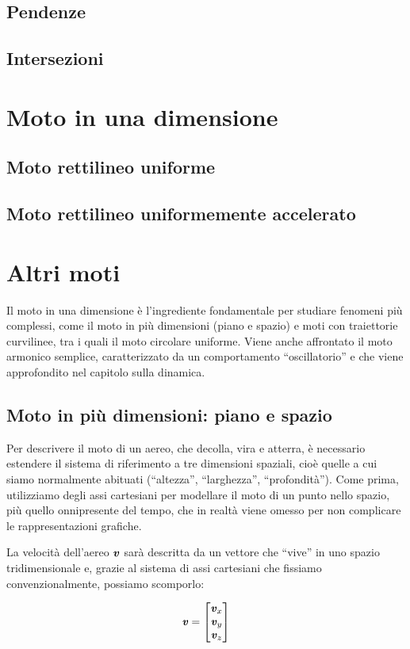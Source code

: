\subsection{Pendenze}
\subsection{Intersezioni}

\section{Moto in una dimensione}
\subsection{Moto rettilineo uniforme}
\subsection{Moto rettilineo uniformemente accelerato}


\section{Altri moti}
Il moto in una dimensione è l'ingrediente fondamentale per studiare
fenomeni più complessi, come il moto in più dimensioni (piano e spazio)
e moti con traiettorie curvilinee, tra i quali il moto circolare
uniforme. Viene anche affrontato il moto armonico semplice, caratterizzato
da un comportamento ``oscillatorio'' e che viene approfondito nel
capitolo sulla dinamica.

\subsection{Moto in più dimensioni: piano e spazio}
Per descrivere il moto di un aereo, che decolla, vira e atterra, è
necessario estendere il sistema di riferimento a tre dimensioni spaziali,
cioè quelle a cui siamo normalmente abituati (``altezza'', ``larghezza'',
``profondità''). Come prima, utilizziamo degli assi cartesiani per
modellare il moto di un punto nello spazio, più quello onnipresente
del tempo, che in realtà viene omesso per non complicare le rappresentazioni
grafiche.

La velocità dell'aereo $\textbf{\textit{v}}$ sarà descritta da un vettore che ``vive'' in uno
spazio tridimensionale e, grazie al sistema di assi cartesiani che
fissiamo convenzionalmente, possiamo scomporlo:

\[
\textbf{\textit{v}} =
\left[
\begin{matrix}
    \textbf{\textit{v}}_x\\
    \textbf{\textit{v}}_y\\
    \textbf{\textit{v}}_z   
\end{matrix}
\right]
\]

